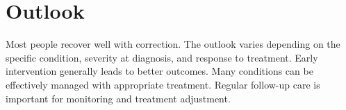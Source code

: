 \section{Outlook}
Most people recover well with correction. The outlook varies depending on the specific condition, severity at diagnosis, and response to treatment. Early intervention generally leads to better outcomes. Many conditions can be effectively managed with appropriate treatment. Regular follow-up care is important for monitoring and treatment adjustment.
